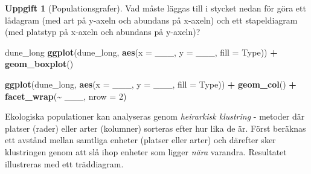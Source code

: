 \documentclass[
]{book}
\newenvironment{Shaded}{\begin{snugshade}}{\end{snugshade}}
\newcommand{\AttributeTok}[1]{\textcolor[rgb]{0.13,0.29,0.53}{#1}}
\newcommand{\DecValTok}[1]{\textcolor[rgb]{0.00,0.00,0.81}{#1}}
\newcommand{\FunctionTok}[1]{\textcolor[rgb]{0.13,0.29,0.53}{\textbf{#1}}}
\newcommand{\NormalTok}[1]{#1}
\newcommand{\OtherTok}[1]{\textcolor[rgb]{0.56,0.35,0.01}{#1}}
\newcommand{\SpecialCharTok}[1]{\textcolor[rgb]{0.81,0.36,0.00}{\textbf{#1}}}
\newcommand{\StringTok}[1]{\textcolor[rgb]{0.31,0.60,0.02}{#1}}
\theoremstyle{definition}
\theoremstyle{definition}
\theoremstyle{definition}
\newtheorem{exercise}{Uppgift}[chapter]
\theoremstyle{definition}
\theoremstyle{remark}
\begin{document}
\begin{exercise}[Populationsgrafer]

Vad måste läggas till i stycket nedan för göra ett lådagram (med art på y-axeln och abundans på x-axeln) och ett stapeldiagram (med platstyp på x-axeln och abundans på y-axeln)?

\begin{Shaded}
\begin{Highlighting}[]
\NormalTok{dune\_long}
\FunctionTok{ggplot}\NormalTok{(dune\_long, }\FunctionTok{aes}\NormalTok{(}\AttributeTok{x =}\NormalTok{ \_\_\_, }\AttributeTok{y =}\NormalTok{ \_\_\_, }\AttributeTok{fill =}\NormalTok{ Type)) }\SpecialCharTok{+}
  \FunctionTok{geom\_boxplot}\NormalTok{()}

\FunctionTok{ggplot}\NormalTok{(dune\_long, }\FunctionTok{aes}\NormalTok{(}\AttributeTok{x =}\NormalTok{ \_\_\_, }\AttributeTok{y =}\NormalTok{ \_\_\_, }\AttributeTok{fill =}\NormalTok{ Type)) }\SpecialCharTok{+}
  \FunctionTok{geom\_col}\NormalTok{() }\SpecialCharTok{+}
  \FunctionTok{facet\_wrap}\NormalTok{(}\SpecialCharTok{\textasciitilde{}}\NormalTok{ \_\_\_, }\AttributeTok{nrow =} \DecValTok{2}\NormalTok{)}
\end{Highlighting}
\end{Shaded}

\end{exercise}

Ekologiska populationer kan analyseras genom \emph{heirarkisk klustring} - metoder där platser (rader) eller arter (kolumner) sorteras efter hur lika de är. Först beräknas ett avstånd mellan samtliga enheter (platser eller arter) och därefter sker klustringen genom att slå ihop enheter som ligger \emph{nära} varandra. Resultatet illustreras med ett träddiagram.

\begin{Shaded}
\end{Shaded}
\end{document}
